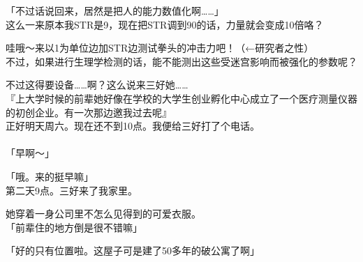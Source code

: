 「不过话说回来，居然是把人的能力数值化啊……」\\

这么一来原本我STR是9，现在把STR调到90的话，力量就会变成10倍咯？

哇哦～来以1为单位边加STR边测试拳头的冲击力吧！（←研究者之性）\\

不过，如果进行生理学检测的话，能不能测出这些受迷宫影响而被强化的参数呢？

不过这得要设备……啊？这么说来三好她……\\

『上大学时候的前辈她好像在学校的大学生创业孵化中心成立了一个医疗测量仪器的初创企业。有一次那边邀我过去呢』\\

正好明天周六。现在还不到10点。我便给三好打了个电话。\\

\sqsplit\\

「早啊～」

「哦。来的挺早嘛」\\

第二天9点。三好来了我家里。

她穿着一身公司里不怎么见得到的可爱衣服。\\

「前辈住的地方倒是很不错嘛」

「好的只有位置啦。这屋子可是建了50多年的破公寓了啊」

